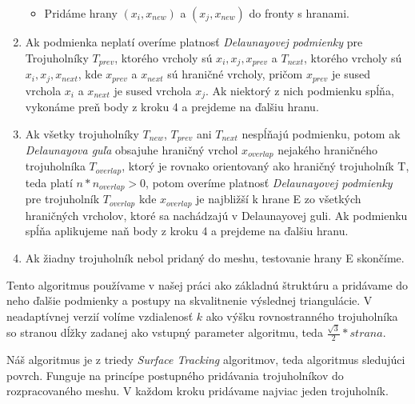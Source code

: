 \begin{enumerate}
{\begin{itemize}
        \item{Pridáme hrany $(x_i, x_{new})$ a 
        $(x_j, x_{new})$ do fronty s hranami.}
    \end{itemize}
    }
    \item{
        Ak podmienka neplatí overíme platnosť \textit{Delaunayovej podmienky} pre Trojuholníky 
        $T_{prev}$, ktorého vrcholy sú $x_i, x_j, 
        x_{prev}$ a $T_{next}$, ktorého vrcholy sú 
        $x_i, x_j, x_{next}$, kde 
        $x_{prev}$ a $x_{next}$ sú hraničné vrcholy,
        pričom $x_{prev}$ 
        je sused vrchola $x_i$ a $x_{next}$ je sused vrchola 
        $x_j$. Ak niektorý z nich podmienku
        spĺňa, vykonáme preň body z kroku 4 a prejdeme na ďalšiu hranu.
    }
    \item{
        Ak všetky trojuholníky $T_{new}$, $T_{prev}$ ani $T_{next}$ nespĺňajú podmienku, potom 
        ak \textit{Delaunayova guľa} obsajuhe hraničný vrchol $x_{overlap}$ nejakého hraničného 
        trojuholníka $T_{overlap}$, ktorý je rovnako orientovaný ako hraničný trojuholník T, teda
        platí $n*n_{overlap} > 0$, potom overíme platnosť \textit{Delaunayovej podmienky} pre 
        trojuholník $T_{overlap}$ kde $x_{overlap}$ je najbližší k hrane E zo všetkých hraničných
        vrcholov, ktoré sa nachádzajú v Delaunayovej guli. Ak podmienku spĺňa aplikujeme naň body z 
        kroku 4 a prejdeme na ďalšiu hranu.
    }
    \item{
        Ak žiadny trojuholník nebol pridaný do meshu, testovanie hrany E skončíme.
    }
\end{enumerate}

Tento algoritmus používame v našej práci ako základnú štruktúru a pridávame do neho ďalšie podmienky 
a postupy na skvalitnenie výslednej triangulácie. V neadaptívnej verzií volíme vzdialenosť $k$ ako 
výšku rovnostranného trojuholníka so stranou dĺžky zadanej ako vstupný parameter algoritmu, teda 
$\frac{\sqrt{3}}{2}*strana$.

Náš algoritmus je z triedy \textit{Surface Tracking} algoritmov, teda algoritmus sledujúci povrch.
Funguje na princípe postupného pridávania trojuholníkov do rozpracovaného meshu. V každom kroku
pridávame najviac jeden trojuholník.

